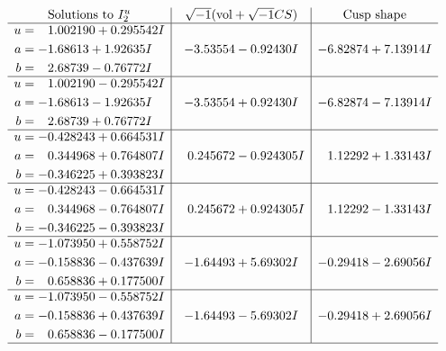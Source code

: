 \documentclass[1p]{elsarticle_modified}
\theoremstyle{definition}
\newcommand{\I}{\sqrt{-1}}
\begin{document}
$$\begin{array}{c|c|c}  
\text{Solutions to }I^u_{2}& \I (\text{vol} + \sqrt{-1}CS) & \text{Cusp shape}\\
 \hline 
\begin{aligned}
u &= \phantom{-}1.002190 + 0.295542 I \\
a &= -1.68613 + 1.92635 I \\
b &= \phantom{-}2.68739 - 0.76772 I\end{aligned}
 & -3.53554 - 0.92430 I & -6.82874 + 7.13914 I \\ \hline\begin{aligned}
u &= \phantom{-}1.002190 - 0.295542 I \\
a &= -1.68613 - 1.92635 I \\
b &= \phantom{-}2.68739 + 0.76772 I\end{aligned}
 & -3.53554 + 0.92430 I & -6.82874 - 7.13914 I \\ \hline\begin{aligned}
u &= -0.428243 + 0.664531 I \\
a &= \phantom{-}0.344968 + 0.764807 I \\
b &= -0.346225 + 0.393823 I\end{aligned}
 & \phantom{-}0.245672 - 0.924305 I & \phantom{-}1.12292 + 1.33143 I \\ \hline\begin{aligned}
u &= -0.428243 - 0.664531 I \\
a &= \phantom{-}0.344968 - 0.764807 I \\
b &= -0.346225 - 0.393823 I\end{aligned}
 & \phantom{-}0.245672 + 0.924305 I & \phantom{-}1.12292 - 1.33143 I \\ \hline\begin{aligned}
u &= -1.073950 + 0.558752 I \\
a &= -0.158836 - 0.437639 I \\
b &= \phantom{-}0.658836 + 0.177500 I\end{aligned}
 & -1.64493 + 5.69302 I & -0.29418 - 2.69056 I \\ \hline\begin{aligned}
u &= -1.073950 - 0.558752 I \\
a &= -0.158836 + 0.437639 I \\
b &= \phantom{-}0.658836 - 0.177500 I\end{aligned}
 & -1.64493 - 5.69302 I & -0.29418 + 2.69056 I\\
 \hline 
 \end{array}$$\newpage\newpage\renewcommand{\arraystretch}{1}
\end{document}
